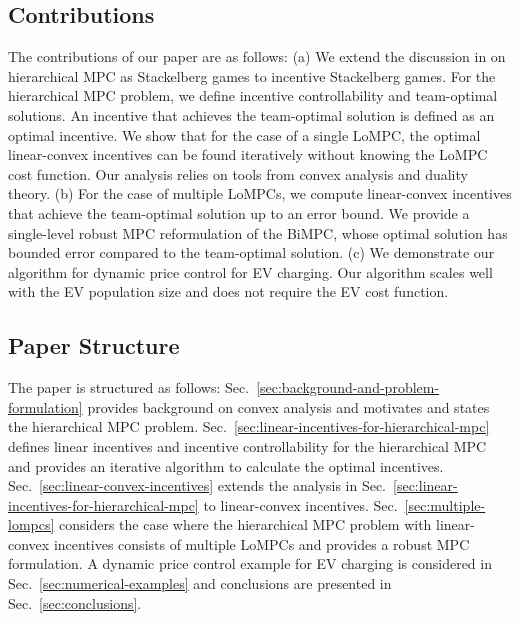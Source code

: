 \subsection{Contributions}
\label{subsec:contribution}

The contributions of our paper are as follows:
(a) We extend the discussion in \cite{mintz2018control} on hierarchical MPC as Stackelberg games to incentive Stackelberg games.
For the hierarchical MPC problem, we define incentive controllability and team-optimal solutions.
An incentive that achieves the team-optimal solution is defined as an optimal incentive.
We show that for the case of a single LoMPC, the
optimal linear-convex incentives can be found iteratively without knowing the LoMPC cost function.
Our analysis relies on tools from convex analysis and duality theory.
(b) For the case of multiple LoMPCs, we compute linear-convex incentives that achieve the team-optimal solution up to an error bound.
We provide a single-level robust MPC reformulation of the BiMPC, whose optimal solution has bounded error compared to the team-optimal solution.
(c) We demonstrate our algorithm for dynamic price control for EV charging.
Our algorithm scales well with the EV population size and does not require the EV cost function.


\subsection{Paper Structure}
\label{subsec:paper-structure}

The paper is structured as follows:
Sec.~\ref{sec:background-and-problem-formulation} provides background on convex analysis and motivates and states the hierarchical MPC problem.
Sec.~\ref{sec:linear-incentives-for-hierarchical-mpc} defines linear incentives and incentive controllability for the hierarchical MPC and provides an iterative algorithm to calculate the optimal incentives.
Sec.~\ref{sec:linear-convex-incentives} extends the analysis in Sec.~\ref{sec:linear-incentives-for-hierarchical-mpc} to linear-convex incentives.
Sec.~\ref{sec:multiple-lompcs} considers the case where the hierarchical MPC problem with linear-convex incentives consists of multiple LoMPCs and provides a robust MPC formulation. %
A dynamic price control example for EV charging is considered in Sec.~\ref{sec:numerical-examples} and conclusions are presented in Sec.~\ref{sec:conclusions}.


